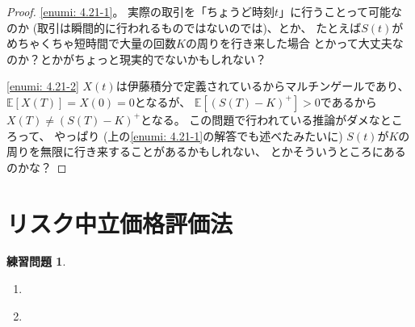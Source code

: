 \documentclass[uplatex]{jsarticle}
\theoremstyle{definition}
\newtheorem{prob}[prob]{練習問題}
\def\E{\mathbb{E}}
\begin{document}
\begin{proof}
  \ref{enumi: 4.21-1}。
  実際の取引を「ちょうど時刻\(t\)」に行うことって可能なのか
  (取引は瞬間的に行われるものではないのでは)、とか、
  たとえば\(S(t)\)がめちゃくちゃ短時間で大量の回数\(K\)の周りを行き来した場合
  とかって大丈夫なのか？とかがちょっと現実的でないかもしれない？

  \ref{enumi: 4.21-2}
  \(X(t)\)は伊藤積分で定義されているからマルチンゲールであり、
  \(\E[X(T)] = X(0) = 0\)となるが、
  \(\E[(S(T)-K)^+] > 0\)であるから\(X(T) \neq (S(T)-K)^+\)となる。
  この問題で行われている推論がダメなところって、
  やっぱり (上の\ref{enumi: 4.21-1}の解答でも述べたみたいに)
  \(S(t)\)が\(K\)の周りを無限に行き来することがあるかもしれない、
  とかそういうところにあるのかな？
\end{proof}









\newpage

\section{リスク中立価格評価法}\label{section: 5}





\begin{prob}\label{prob: 5.1}
  \begin{enumerate}
    \item \label{enumi: 5.1-1}
    \item \label{enumi: 5.1-2}
  \end{enumerate}
\end{prob}
\end{document}
